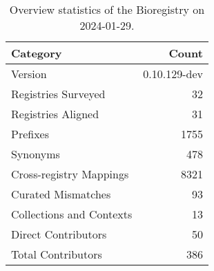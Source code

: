 \begin{table}
\caption{Overview statistics of the Bioregistry on 2024-01-29.}
\label{tab:bioregistry-summary}
\begin{tabular}{lr}
\toprule
Category & Count \\
\midrule
Version & 0.10.129-dev \\
Registries Surveyed & 32 \\
Registries Aligned & 31 \\
Prefixes & 1755 \\
Synonyms & 478 \\
Cross-registry Mappings & 8321 \\
Curated Mismatches & 93 \\
Collections and Contexts & 13 \\
Direct Contributors & 50 \\
Total Contributors & 386 \\
\bottomrule
\end{tabular}
\end{table}

